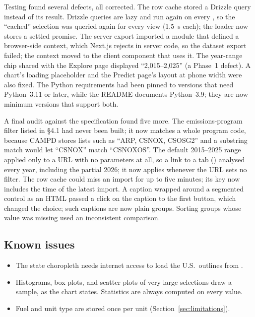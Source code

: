 \documentclass[11pt,a4paper]{article}
\begin{document}
Testing found several defects, all corrected. The row cache stored a Drizzle query
instead of its result. Drizzle queries are lazy and run again on every , so the
``cached'' selection was queried again for every view (1.5~s each); the loader now stores a
settled promise. The server export imported a module that defined a browser-side context, which
Next.js rejects in server code, so the dataset export failed; the context moved to the client
component that uses it. The year-range chip shared with the Explore page displayed
``2,015--2,025'' (a Phase~1 defect). A chart's loading placeholder and the Predict page's layout
at phone width were also fixed. The Python requirements had been pinned to versions that need
Python~3.11 or later, while the README documents Python~3.9; they are now minimum versions that
support both.

A final audit against the specification found five more. The emissions-program filter listed in
\S4.1 had never been built; it now matches a whole program code, because CAMPD stores lists such
as ``ARP, CSNOX, CSOSG2'' and a substring match would let ``CSNOX'' match ``CSNOXOS''. The
default 2015--2025 range applied only to a URL with no parameters at all, so a link to a tab
() analysed every year, including the partial 2026; it now applies
whenever the URL sets no filter. The row cache could miss an import for up to five minutes; its key
now includes the time of the latest import. A caption wrapped around a segmented control as an
HTML  passed a click on the caption to the first button, which changed the choice;
such captions are now plain groups. Sorting groups whose value was missing used an inconsistent
comparison.

\subsection{Known issues}
\label{sec:known}

\begin{itemize}
  \item The state choropleth needs internet access to load the U.S.\ outlines from
        .
  \item Histograms, box plots, and scatter plots of very large selections draw a sample, as the
        chart states. Statistics are always computed on every value.
  \item Fuel and unit type are stored once per unit (Section~\ref{sec:limitations}).
\end{itemize}
\end{document}
